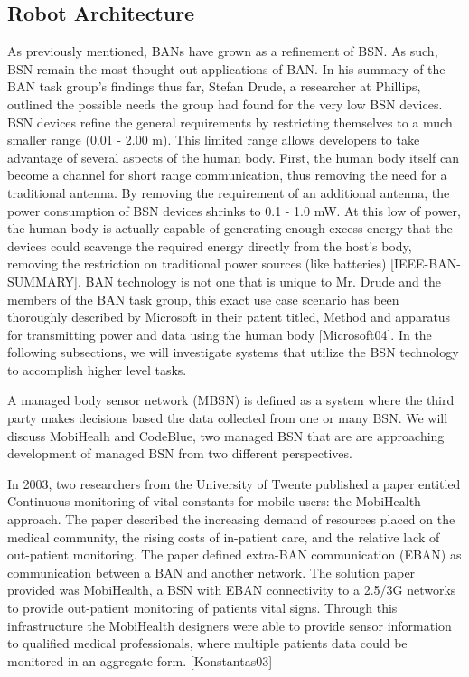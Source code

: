 \subsection{Robot Architecture}
As previously mentioned, BANs have grown as a refinement of BSN. As such, BSN remain the most thought out applications of BAN. In his summary of the BAN task group's findings thus far, Stefan Drude, a researcher at Phillips, outlined the possible needs the group had found for the very low BSN devices. BSN devices refine the general requirements by restricting themselves to a much smaller range (0.01 - 2.00 m). This limited range allows developers to take advantage of several aspects of the human body. First, the human body itself can become a channel for short range communication, thus removing the need for a traditional antenna. By removing the requirement of an additional antenna, the power consumption of BSN devices shrinks to 0.1 - 1.0 mW. At this low of power, the human body is actually capable of generating enough excess energy that the devices could scavenge the required energy directly from the host's body, removing the restriction on traditional power sources (like batteries) [IEEE-BAN-SUMMARY]. BAN technology is not one that is unique to Mr. Drude and the members of the BAN task group, this exact use case scenario has been thoroughly described by Microsoft in their patent titled, Method and apparatus for transmitting power and data using the human body [Microsoft04]. In the following subsections, we will investigate systems that utilize the BSN technology to accomplish higher level tasks.

A managed body sensor network (MBSN) is defined as a system where the third party makes decisions based the data collected from one or many BSN. We will discuss MobiHealh and CodeBlue, two managed BSN that are are approaching development of managed BSN from two different perspectives.


In 2003, two researchers from the University of Twente published a paper entitled Continuous monitoring of vital constants for mobile users: the MobiHealth approach. The paper described the increasing demand of resources placed on the medical community, the rising costs of in-patient care, and the relative lack of out-patient monitoring. The paper defined extra-BAN communication (EBAN) as communication between a BAN and another network. The solution paper provided was MobiHealth, a BSN with EBAN connectivity to a 2.5/3G networks to provide out-patient monitoring of patients vital signs. Through this infrastructure the MobiHealth designers were able to provide sensor information to qualified medical professionals, where multiple patients data could be monitored in an aggregate form. [Konstantas03]

